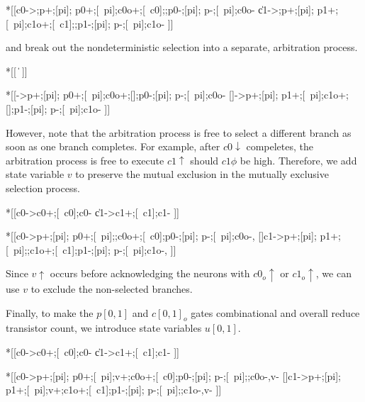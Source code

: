 \documentclass{article}
\begin{document}
\begin{hse}
*[[c0\phi->;p\phi+;[pi];
    p0+;[~pi];c0o+;[~c0\phi];;p0-;[pi];
    p\phi-;[~pi];c0o-
  \|c1\phi->;p\phi+;[pi];
    p1+;[~pi];c1o+;[~c1\phi];;p1-;[pi];
    p\phi-;[~pi];c1o-
 ]]
\end{hse}

\noindent
and break out the nondeterministic selection into a separate, arbitration process.

\begin{hse}
*[[
  \|
 ]]

*[[->p\phi+;[pi];
    p0+;[~pi];c0o+;[];p0-;[pi];
    p\phi-;[~pi];c0o-
  []->p\phi+;[pi];
    p1+;[~pi];c1o+;[];p1-;[pi];
    p\phi-;[~pi];c1o-
 ]]
\end{hse}

\noindent
However, note that the arbitration process is free to select a different branch
as soon as one branch completes. For example, after $c0\!\downarrow$ compeletes,
the arbitration process is free to execute $c1\!\uparrow$ should $c1\phi$ be high.
Therefore, we add state variable $v$ to preserve the mutual exclusion in the
mutually exclusive selection process.

\begin{hse}
*[[c0\phi->c0+;[~c0\phi];c0-
  \|c1\phi->c1+;[~c1\phi];c1-
 ]]

*[[c0->p\phi+;[pi];
    p0+;[~pi];;c0o+;[~c0];p0-;[pi];
    p\phi-;[~pi];c0o-,
  []c1->p\phi+;[pi];
    p1+;[~pi];;c1o+;[~c1];p1-;[pi];
    p\phi-;[~pi];c1o-,
 ]]
\end{hse}

\noindent
Since $v\!\uparrow$ occurs before acknowledging the neurons with $c0_o\!\uparrow$
or $c1_o\!\uparrow$, we can use $v$ to exclude the non-selected branches.

\noindent
Finally, to make the $p[0,1]$ and $c[0,1]_o$ gates combinational and overall 
reduce transistor count, we introduce state variables $u[0,1]$.

\begin{hse}
*[[c0\phi->c0+;[~c0\phi];c0-
  \|c1\phi->c1+;[~c1\phi];c1-
 ]]

*[[c0->p\phi+;[pi];
    p0+;[~pi];v+;c0o+;[~c0];p0-;[pi];
    p\phi-;[~pi];;c0o-,v-
  []c1->p\phi+;[pi];
    p1+;[~pi];v+;c1o+;[~c1];p1-;[pi];
    p\phi-;[~pi];;c1o-,v-
 ]]
\end{hse}
\end{document}
